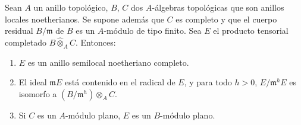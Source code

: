 \begin{lemma}[19.7.1.2]
\label{0.19.7.1.2-fr}
Sean $A$ un anillo topológico, $B$, $C$ dos $A$-álgebras topológicas que
son anillos locales noetherianos. Se supone además que $C$ es completo
y que el cuerpo residual $B/\mathfrak m$ de $B$ es un $A$-módulo de tipo finito.
Sea $E$ el producto tensorial completado $B\widehat\otimes_A C$. Entonces:
\begin{enumerate}
  \item[\textup{(i)}] $E$ es un anillo semilocal noetheriano completo.
  \item[\textup{(ii)}] El ideal $\mathfrak mE$ está contenido en el radical de $E$, y
  para todo $h>0$, $E/\mathfrak m^hE$ es isomorfo a
  $(B/\mathfrak m^h)\otimes_A C$.
  \item[\textup{(iii)}] Si $C$ es un $A$-módulo plano, $E$ es un $B$-módulo plano.
\end{enumerate}
\end{lemma}

